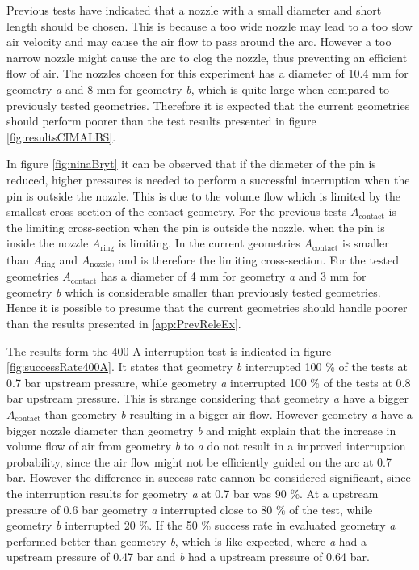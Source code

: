 \documentclass[10pt,a4paper,twoside]{article}
\begin{document}
Previous tests have indicated that a nozzle with a small diameter and short length should be chosen. This is because a too wide nozzle may lead to a too slow air velocity and may cause the air flow to pass around the arc. However a too narrow nozzle might cause the arc to clog the nozzle, thus preventing an efficient flow of air. The nozzles chosen for this experiment has a diameter of  10.4 mm for geometry \textit{a} and 8 mm for geometry \textit{b}, which is quite large when compared to previously tested geometries. Therefore it is expected that the current geometries should perform poorer than the test results presented in figure \ref{fig:resultsCIMALBS}.

In figure \ref{fig:ninaBryt} it can be observed that if the diameter of the pin is reduced, higher pressures is needed to perform a successful interruption when the pin is outside the nozzle. This is due to the volume flow which is limited by the smallest cross-section of the contact geometry. For the previous tests $A_\mathrm{{contact}}$ is the limiting cross-section when the pin is outside the nozzle, when the pin is inside the nozzle $A_\mathrm{{ring}}$ is limiting. In the current geometries $A_\mathrm{{contact}}$ is smaller than $A_\mathrm{{ring}}$ and $A_\mathrm{{nozzle}}$, and is therefore the limiting cross-section. For the tested geometries $A_\mathrm{{contact}}$ has a diameter of 4 mm for geometry \textit{a} and 3 mm for geometry \textit{b} which is considerable smaller than previously tested geometries. Hence it is possible to presume that the current geometries should handle poorer than the results presented in \ref{app:PrevReleEx}.

The results form the 400 A interruption test is indicated in figure \ref{fig:successRate400A}. It states that geometry \textit{b} interrupted 100 \% of the tests at 0.7 bar upstream pressure, while geometry \textit{a} interrupted 100 \% of the tests at 0.8 bar upstream pressure. This is strange considering that geometry \textit{a} have a bigger $A_\mathrm{{contact}}$ than geometry \textit{b} resulting in a bigger air flow. However geometry \textit{a} have a bigger nozzle diameter than geometry \textit{b} and might explain that the increase in volume flow of air from geometry \textit{b} to \textit{a} do not result in a improved interruption probability, since the air flow might not be efficiently guided on the arc at 0.7 bar. However the difference in success rate cannon be considered significant, since the interruption results for geometry \textit{a} at 0.7 bar was 90 \%. At a upstream pressure of 0.6 bar geometry \textit{a} interrupted close to 80 \% of the test, while geometry \textit{b} interrupted 20 \%. If the 50 \% success rate in evaluated geometry \textit{a} performed better than geometry \textit{b}, which is like expected, where \textit{a} had a upstream pressure of 0.47 bar and \textit{b} had a upstream pressure of 0.64 bar.
\end{document}

